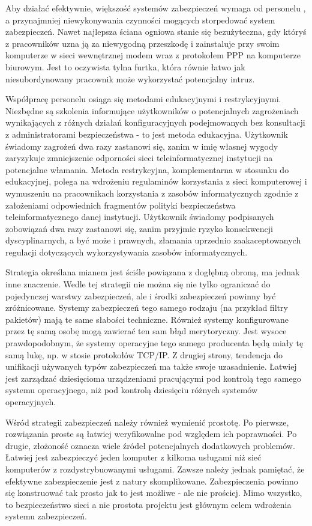 Aby działać efektywnie, większość systemów zabezpieczeń wymaga od personelu
, a przynajmniej niewykonywania czynności mogących storpedować
system zabezpieczeń. Nawet najlepsza ściana ogniowa stanie się bezużyteczna,
gdy któryś z pracowników uzna ją za niewygodną przeszkodę i zainstaluje przy
swoim komputerze w sieci wewnętrznej modem wraz z protokołem PPP na
komputerze biurowym. Jest to oczywista tylna furtka, która równie łatwo jak
niesubordynowany pracownik może wykorzystać potencjalny intruz.

Współpracę personelu osiąga się metodami edukacyjnymi i restrykcyjnymi.
Niezbędne są szkolenia informujące użytkowników o potencjalnych zagrożeniach
wynikających z różnych działań konfiguracyjnych podejmowanych bez
konsultacji z administratorami bezpieczeństwa - to jest metoda edukacyjna.
Użytkownik świadomy zagrożeń dwa razy zastanowi się, zanim w imię własnej
wygody zaryzykuje zmniejszenie odporności sieci teleinformatycznej
instytucji na potencjalne włamania. Metoda restrykcyjna, komplementarna w
stosunku do edukacyjnej, polega na wdrożeniu regulaminów korzystania z sieci
komputerowej i wymuszeniu na pracownikach korzystania z zasobów
informatycznych zgodnie z założeniami odpowiednich fragmentów polityki
bezpieczeństwa teleinformatycznego danej instytucji.  Użytkownik świadomy
podpisanych zobowiązań dwa razy zastanowi się, zanim przyjmie ryzyko
konsekwencji dyscyplinarnych, a być może i prawnych, złamania uprzednio
zaakaceptowanych regulacji dotyczących wykorzystywania zasobów
informatycznych.

Strategia określana mianem  jest ściśle powiązana z
dogłębną obroną, ma jednak inne znaczenie. Wedle tej strategii nie można się
nie tylko ograniczać do pojedynczej warstwy zabezpieczeń, ale i środki
zabezpieczeń powinny być zróżnicowane. Systemy zabezpieczeń tego samego
rodzaju (na przykład filtry pakietów) mają te same słabości techniczne.
Również systemy konfigurowane przez tę samą osobę mogą zawierać ten sam błąd
merytoryczny. Jest wysoce prawdopodobnym, że systemy operacyjne tego samego
producenta będą miały tę samą lukę, np. w stosie protokołów TCP/IP. Z
drugiej strony, tendencja do unifikacji używanych typów zabezpieczeń ma
także swoje uzasadnienie. Łatwiej jest zarządzać dziesięcioma urządzeniami
pracującymi pod kontrolą tego samego systemu operacyjnego, niż pod kontrolą
dziesięciu różnych systemów operacyjnych.

Wśród strategii zabezpieczeń należy również wymienić prostotę. Po pierwsze,
rozwiązania proste są łatwiej weryfikowalne pod względem ich poprawności. Po
drugie, złożoność oznacza wiele źródeł potencjalnych dodatkowych problemów.
Łatwiej jest zabezpieczyć jeden komputer z kilkoma usługami niż sieć
komputerów z rozdystrybuowanymi usługami. Zawsze należy jednak pamiętać, że
efektywne zabezpieczenie jest z natury skomplikowane. Zabezpieczenia powinno
się konstruować tak prosto jak to jest możliwe - ale nie prościej. Mimo
wszystko, to bezpieczeństwo sieci a nie prostota projektu jest głównym celem
wdrożenia systemu zabezpieczeń.

